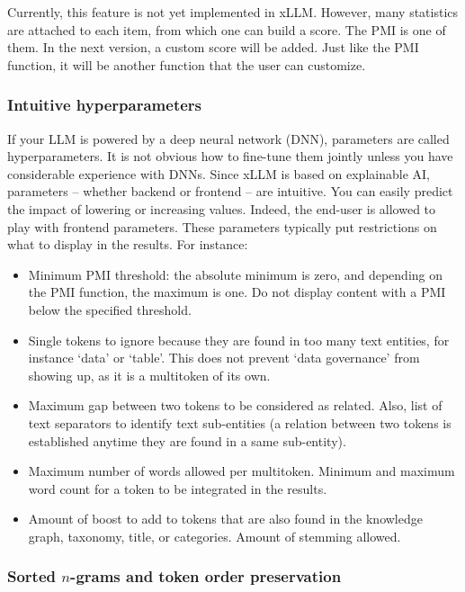 \documentclass[10pt]{article}
\begin{document}
{Currently, this feature is not yet implemented in xLLM. However, many statistics are attached to each item, from which one can build a score. The \textcolor{index}{PMI} is one of them. In the next version,
 a custom score will be added. Just like the PMI function, it will be another function that the user can customize. 

\subsubsection{Intuitive hyperparameters}\label{ipoht}

If your LLM is powered by a deep neural network (DNN), parameters are called 
\textcolor{index}{hyperparameters}. It is not obvious how to fine-tune them jointly unless you have considerable experience with DNNs. Since xLLM is based on \textcolor{index}{explainable AI}, parameters 
 -- whether backend or frontend -- are 
 intuitive. You can easily predict the impact of lowering or increasing values. Indeed, the end-user is allowed to play
 with frontend parameters. These parameters typically put restrictions on what to display in the results. For instance:
\vspace{1ex}
\begin{itemize}
\item  Minimum PMI threshold: the absolute minimum is zero, and depending on the PMI function, the maximum is one.
 Do not display content with a PMI below the specified threshold.
 \item Single tokens to ignore because they are found in too many text entities, for instance `data' or `table'. This does not prevent
 `data governance' from showing up, as it is a multitoken of its own. 
 \item Maximum gap between two tokens to be considered as related. Also, list of text separators to identify text sub-entities 
(a relation between two tokens is established anytime they are found in a same sub-entity).
 \item Maximum number of words allowed per multitoken.  Minimum and maximum word count for a token to be integrated in the results. 
\item Amount of boost to add to tokens that are also found in the knowledge graph, taxonomy, title, or categories.
 Amount of stemming allowed.
 \end{itemize}


\subsubsection{Sorted $n$-grams and token order preservation}

}
\end{document}
